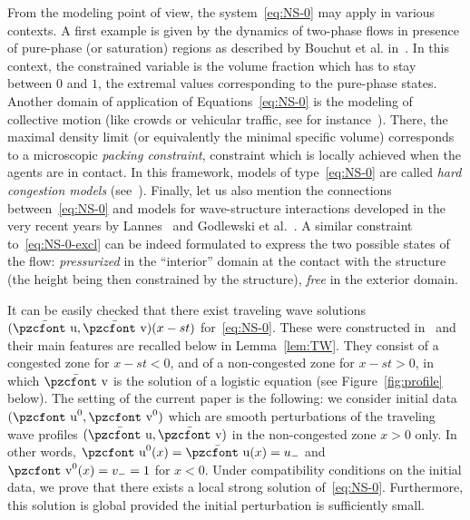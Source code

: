\documentclass[10pt]{amsart}
\theoremstyle{definition}\newtheorem{defi}[theo]{Definition}\newtheorem{rema}[theo]{Remark}\newtheorem{exam}[theo]{Example}\newtheorem{exem}[theo]{Example}\newtheorem{nota}[theo]{Notation}
\newcommand{\mathpzc}[1]{\text{\pzcfont #1}}
\newcommand{\bv}{\bar{\mathpzc{v}}}
\newcommand{\bu}{\bar{\mathpzc{u}}}
\newcommand{\tv}{\mathpzc{v}}
\newcommand{\tu}{\mathpzc{u}}
\begin{document}
From the modeling point of view, the system~\eqref{eq:NS-0} may apply in various contexts. A first example is given by the dynamics of two-phase flows in presence of pure-phase (or saturation) regions as described by Bouchut et al. in~\cite{bouchut2000}. In this context, the constrained variable is the volume fraction which has to stay between $0$ and $1$, the extremal values corresponding to the pure-phase states. Another domain of application of Equations~\eqref{eq:NS-0} is the modeling of collective motion (like crowds or vehicular traffic, see for instance~\cite{berthelin2017,degond2011,maury2011}). There, the maximal density limit (or equivalently the minimal specific volume) corresponds to a microscopic \emph{packing constraint}, constraint which is locally achieved when the agents are in contact. In this framework, models of type~\eqref{eq:NS-0} are called \emph{hard congestion models} (see~\cite{maury2012}). Finally, let us also mention the connections between~\eqref{eq:NS-0} and models for wave-structure interactions developed in the very recent years by Lannes~\cite{lannes2017} and Godlewski et al.~\cite{godlewski2018}. A similar constraint to~\eqref{eq:NS-0-excl} can be indeed formulated to express the two possible states of the flow: \emph{pressurized} in the ``interior'' domain at the contact with the structure (the height being then constrained by the structure), \emph{free} in the exterior domain.


It can be easily checked that there exist traveling wave solutions $(\bu, \bv)(x-st)$ for~\eqref{eq:NS-0}. These were constructed in~\cite{DP} and their main features are recalled below in Lemma~\ref{lem:TW}. They consist of a congested zone for $x-st<0$, and of a non-congested zone for $x-st>0$, in which $\bv$ is the solution of a logistic equation (see Figure~\ref{fig:profile} below). The setting of the current paper is the following: we consider initial data $(\tu^0, \tv^0)$ which are smooth perturbations of the traveling wave profiles $(\bu,\bv)$ in the non-congested zone $x>0$ only. In other words, $\tu^0(x)=\bu(x)=u_-$ and $\tv^0(x)=v_-=1$ for $x<0$. Under compatibility conditions on the initial data, we prove that there exists a local strong solution of~\eqref{eq:NS-0}. Furthermore, this solution is global provided the initial perturbation is sufficiently small.
\end{document}
